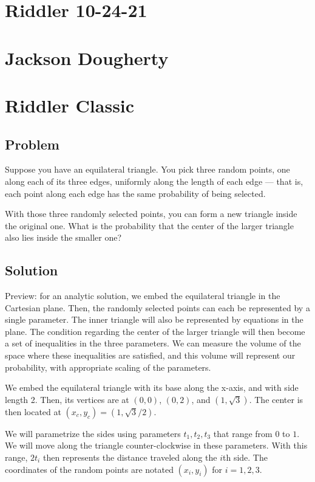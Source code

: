 \documentclass[reqno]{amsart}
\begin{document}
\section*{Riddler 10-24-21}
\section*{Jackson Dougherty}

\section{Riddler Classic}

\subsection*{Problem}

Suppose you have an equilateral triangle. You pick three random points, one along each of its three edges, uniformly along the length of each edge — that is, each point along each edge has the same probability of being selected.

With those three randomly selected points, you can form a new triangle inside the original one. What is the probability that the center of the larger triangle also lies inside the smaller one?

\subsection*{Solution}

Preview: for an analytic solution, we embed the equilateral triangle in the Cartesian plane. Then, the randomly selected points can each be represented by a single parameter. The inner triangle will also be represented by equations in the plane. The condition regarding the center of the larger triangle will then become a set of inequalities in the three parameters. We can measure the volume of the space where these inequalities are satisfied, and this volume will represent our probability, with appropriate scaling of the parameters. 

We embed the equilateral triangle with its base along the x-axis, and with side length 2. Then, its vertices are at $(0,0)$, $(0,2)$, and $(1, \sqrt{3})$. The center is then located at $(x_c, y_c) =(1,\sqrt{3}/2)$. 

We will parametrize the sides using parameters $t_1, t_2, t_3$ that range from $0$ to $1$. We will move along the triangle counter-clockwise in these parameters. With this range, $2t_i$ then represents the distance traveled along the $i$th side. The coordinates of the random points are notated $(x_i, y_i)$ for $i=1,2,3$. 
\end{document}
